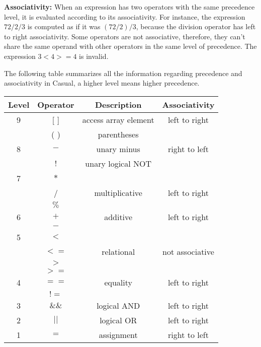 \documentclass[12pt]{article}
\begin{document}
\textbf{Associativity:} When an expression has two operators with the same precedence level, it is evaluated according to its associativity.  For instance, the expression $72 / 2 / 3$ is computed as if it was $(72 / 2) / 3$, because the division operator has left to right associativity. Some operators are not associative, therefore, they can't share the same operand with other operators in the same level of precedence. The expression $3 < 4 >= 4$ is invalid.

The following table summarizes all the information regarding precedence and associativity in Casual, a higher level means higher precedence.

\begin{table}[htb]
\centering
\begin{tabular}{| c | c | c | c |} 
 \hline
Level & Operator & Description & Associativity        \\ \hline
 9    & [ ]      & access array element & left to right \\ 
      & ( )      & parentheses          &  \\ \hline\hline
          
 8    & $- $     & unary minus          & right to left \\ 
      & $!$      & unary logical NOT    & \\ \hline\hline
      
 7    & $*$      &                      & \\ 
      & /        & multiplicative       & left to right \\
      & $\%$     &                      & \\ \hline\hline
      
 6    & $+$      & additive             & left to right\\
      & $-$      &                      & \\  \hline\hline
 
 5    & $< $     &                      & \\
      & $<=$     & relational           & not associative\\
      & $> $     &                      & \\
      & $>=$     &                      &  \\  \hline\hline 
      
 4    & $==$     & equality             & left to right\\
      & $!=$     &                      & \\ \hline\hline
      
 3    & $\&\&$   & logical AND          & left to right\\   \hline\hline
 
 2    & $||$     & logical OR           & left to right\\   \hline\hline
 
 1    & $=$      & assignment           & right to left \\   \hline
 
\end{tabular}
\end{table}
\end{document}
